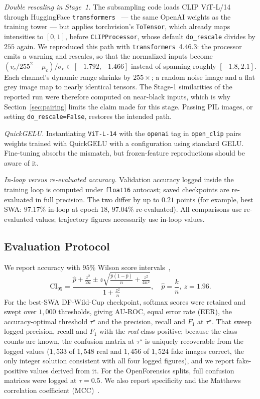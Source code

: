 \documentclass[10pt,journal]{IEEEtran}
\begin{document}
\emph{Double rescaling in Stage~1.} The subsampling code loads CLIP ViT-L/14
through HuggingFace \texttt{transformers}~\cite{wolf2020transformers} --- the
same OpenAI weights as the training tower --- but applies torchvision's
\texttt{ToTensor}, which already maps intensities to $[0,1]$, before
\texttt{CLIPProcessor}, whose default \texttt{do\_rescale} divides by $255$
again. We reproduced this path with \texttt{transformers}~4.46.3: the processor
emits a warning and rescales, so that the normalized inputs become
$(v_c/255^2-\mu_c)/\sigma_c\in[-1.792,-1.466]$ instead of spanning roughly
$[-1.8,2.1]$. Each channel's dynamic range shrinks by $255\times$; a random
noise image and a flat grey image map to nearly identical tensors. The Stage-1
similarities of the reported run were therefore computed on near-black inputs,
which is why Section~\ref{sec:pairing} limits the claim made for this stage.
Passing PIL images, or setting \texttt{do\_rescale=False}, restores the intended
path.

\emph{QuickGELU.} Instantiating \texttt{ViT-L-14} with the \texttt{openai} tag in
\texttt{open\_clip} pairs weights trained with QuickGELU with a configuration
using standard GELU. Fine-tuning absorbs the mismatch, but frozen-feature
reproductions should be aware of it.

\emph{In-loop versus re-evaluated accuracy.} Validation accuracy logged inside
the training loop is computed under \texttt{float16} autocast; saved checkpoints
are re-evaluated in full precision. The two differ by up to $0.21$ points (for
example, best SWA: $97.17\%$ in-loop at epoch $18$, $97.04\%$ re-evaluated). All
comparisons use re-evaluated values; trajectory figures necessarily use in-loop
values.

\subsection{Evaluation Protocol}
We report accuracy with $95\%$ Wilson score intervals~\cite{wilson1927interval},
\begin{equation}
\mathrm{CI}_{95}=\frac{\hat{p}+\frac{z^2}{2n}\pm z\sqrt{\frac{\hat{p}(1-\hat{p})}{n}
      +\frac{z^2}{4n^2}}}{1+\frac{z^2}{n}},\quad \hat p=\frac{k}{n},\ z=1.96.
\end{equation}
For the best-SWA DF-Wild-Cup checkpoint, softmax scores were retained and swept
over $1{,}000$ thresholds, giving AU-ROC, equal error rate (EER), the
accuracy-optimal threshold $\tau^\star$ and the precision, recall and $F_1$ at
$\tau^\star$. That sweep logged precision, recall and $F_1$ with the \emph{real}
class positive; because the class counts are known, the confusion matrix at
$\tau^\star$ is uniquely recoverable from the logged values
($1{,}533$ of $1{,}548$ real and $1{,}456$ of $1{,}524$ fake images correct, the
only integer solution consistent with all four logged figures), and we report
fake-positive values derived from it. For the OpenForensics splits, full
confusion matrices were logged at $\tau=0.5$. We also report specificity and
the Matthews correlation coefficient (MCC)~\cite{matthews1975mcc}.
\end{document}
